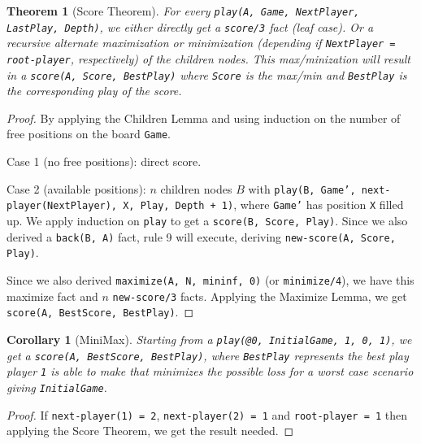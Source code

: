 \documentclass[9pt]{article}
\newtheorem{theorem}{Theorem}
\newtheorem{corollary}{Corollary}
\begin{document}
\begin{theorem}[Score Theorem]
For every \texttt{play(A, Game, NextPlayer, LastPlay, Depth)}, we either
directly get a \texttt{score/3} fact (leaf case). Or a recursive alternate maximization or
minimization (depending if \texttt{NextPlayer = root-player}, respectively) of
the children nodes. This max/minization will result in a \texttt{score(A, Score,
BestPlay)} where \texttt{Score} is the max/min and \texttt{BestPlay} is the
corresponding play of the score.
\end{theorem}
\begin{proof}
By applying the Children Lemma and using induction on the number of free
positions on the board \texttt{Game}.

Case 1 (no free positions): direct score.

Case 2 (available positions): $n$ children nodes $B$ with \texttt{play(B, Game',
      next-player(NextPlayer), X, Play, Depth + 1)}, where \texttt{Game'} has
position \texttt{X} filled up. We apply induction on \texttt{play} to get a
\texttt{score(B, Score, Play)}. Since we also derived a \texttt{back(B, A)}
fact, rule 9 will execute, deriving \texttt{new-score(A, Score, Play)}.

Since we also derived \texttt{maximize(A, N, mininf, 0)} (or
\texttt{minimize/4}), we have this maximize fact and $n$ \texttt{new-score/3}
facts. Applying the Maximize Lemma, we get \texttt{score(A, BestScore,
BestPlay)}.
\end{proof}

\begin{corollary}[MiniMax]
Starting from a \texttt{play(@0, InitialGame, 1, 0, 1)}, we get a
\texttt{score(A, BestScore, BestPlay)}, where \texttt{BestPlay} represents the
best play player \texttt{1} is able to make that minimizes the possible loss for
a worst case scenario giving \texttt{InitialGame}.
\end{corollary}
\begin{proof}
If \texttt{next-player(1) = 2}, \texttt{next-player(2) = 1} and
\texttt{root-player = 1} then applying the Score Theorem, we get the result
needed.
\end{proof}
\end{document}
